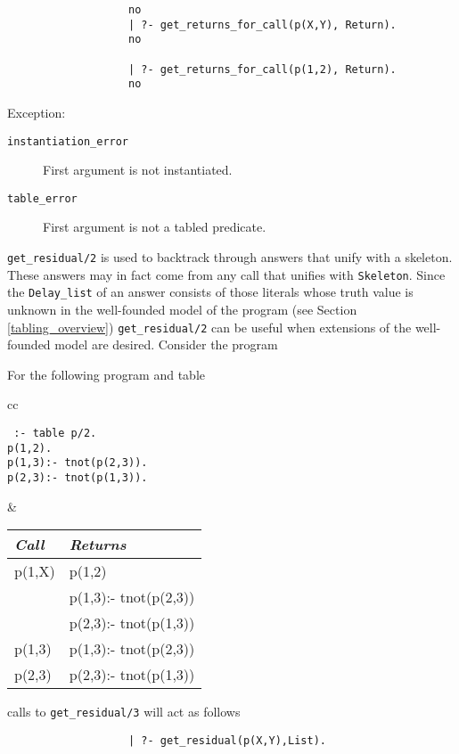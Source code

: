 \begin{description}
{\begin{verbatim}
                   no
                   | ?- get_returns_for_call(p(X,Y), Return).
                   no

                   | ?- get_returns_for_call(p(1,2), Return).
                   no
      \end{verbatim}
      }

Exception:
    \begin{description}
    \item[{\tt instantiation\_error}]
	First argument is not instantiated.
    \item[{\tt table\_error}]
	First argument is not a tabled predicate.
    \end{description}


%
{\tt get\_residual/2} is used to backtrack through answers that unify
with a skeleton.  These answers may in fact come from any call that
unifies with {\tt Skeleton}.  Since the {\tt Delay\_list} of an answer
consists of those literals whose truth value is unknown in the
well-founded model of the program (see Section \ref{tabling_overview})
{\tt get\_residual/2} can be useful when extensions of the
well-founded model are desired.  Consider the program

For the following program and table
     \begin{center}
     \begin{tabular}{cc}
     \begin{minipage}{2.1in}
     {\tt
          :- table p/2.	\\
	  p(1,2). \\
	  p(1,3):- tnot(p(2,3)). \\
	  p(2,3):- tnot(p(1,3)). 
     }
     \end{minipage}
     &
     \begin{tabular}{||l|l||}   \hline
     {\em Call}			& {\em Returns} \\ \hline \hline
     p(1,X)			& p(1,2) \\ 
 	       			& p(1,3):- tnot(p(2,3)) \\
 	       			& p(2,3):- tnot(p(1,3)) \\ \hline
     p(1,3)			& p(1,3):- tnot(p(2,3)) \\ \hline
     p(2,3)			& p(2,3):- tnot(p(1,3)) \\ \hline
     \end{tabular}
     \end{tabular}
     \end{center}
calls to {\tt get\_residual/3} will act as follows
%
{\footnotesize 
\begin{verbatim} 
                   | ?- get_residual(p(X,Y),List).


\end{verbatim}}
\end{description}
